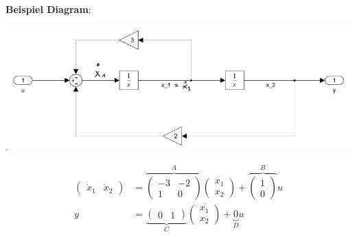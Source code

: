 \noindent\textbf{Beispiel Diagram}:
\begin{center}
	\includegraphics[width=\columnwidth]{Images/zrd1}
\end{center}
\begin{align*}
	\begin{pmatrix}	\dot{x}_1 & \dot{x}_2 \end{pmatrix} &=\overbrace{ \begin{pmatrix} -3 & -2 \\ 1 & 0 \end{pmatrix}}^{A}
	\begin{pmatrix}
		x_1 \\ x_2
	\end{pmatrix} + \overbrace{\begin{pmatrix}
			1 \\ 0
	\end{pmatrix}}^{B}u \\
	y &= \underbrace{\begin{pmatrix}
			0 & 1
	\end{pmatrix}}_{C} \begin{pmatrix}
x_1 \\ x_2
\end{pmatrix} + \underbrace{0}_{D}u
\end{align*}

